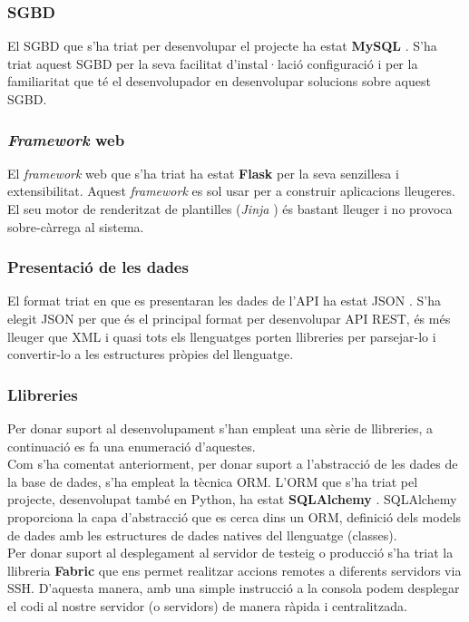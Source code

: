 	\subsubsection{\ac{SGBD}}
	El \ac{SGBD} que s'ha triat per desenvolupar el projecte ha estat \textbf{MySQL} \cite{mysql}. S'ha triat aquest \ac{SGBD} per la seva facilitat d'instal·lació configuració i per la familiaritat que té el desenvolupador en desenvolupar solucions sobre aquest \ac{SGBD}.

	\subsubsection{\emph{Framework} web}
	El \emph{framework} web que s'ha triat ha estat \textbf{Flask} \cite{flask} per la seva senzillesa i extensibilitat. Aquest \emph{framework} es sol usar per a construir aplicacions lleugeres. El seu motor de renderitzat de plantilles (\emph{Jinja} \cite{jinja}) és bastant lleuger i no provoca sobre-càrrega al sistema. 

	\subsubsection{Presentació de les dades}
	El format triat en que es presentaran les dades de l'\ac{API} ha estat \ac{JSON} \cite{json}. S'ha elegit \ac{JSON} per que és el principal format per desenvolupar \ac{API} \ac{REST}, és més lleuger que \ac{XML} i quasi tots els llenguatges porten llibreries per parsejar-lo i convertir-lo a les estructures pròpies del llenguatge.

	\subsubsection{Llibreries}
	Per donar suport al desenvolupament s'han empleat una sèrie de llibreries, a continuació es fa una enumeració d'aquestes.\\

	Com s'ha comentat anteriorment, per donar suport a l'abstracció de les dades de la base de dades, s'ha empleat la tècnica \ac{ORM}. L'\ac{ORM} que s'ha triat pel projecte, desenvolupat també en Python, ha estat \textbf{SQLAlchemy} \cite{sqlalchemy}. SQLAlchemy proporciona la capa d'abstracció que es cerca dins un \ac{ORM}, definició dels models de dades amb les estructures de dades natives del llenguatge (classes).\\

	Per donar suport al desplegament al servidor de testeig o producció s'ha triat la llibreria \textbf{Fabric} \cite{fabric} que ens permet realitzar accions remotes a diferents servidors via \ac{SSH}. D'aquesta manera, amb una simple instrucció a la consola podem desplegar el codi al nostre servidor (o servidors) de manera ràpida i centralitzada.\\

